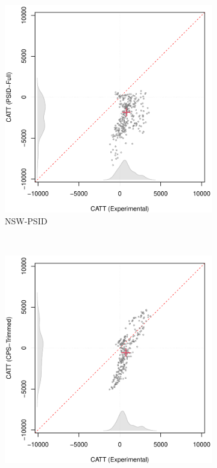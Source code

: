 \documentclass[letterpaper,12pt,leqno]{article}
\begin{document}
\begin{figure}[!ht]
\begin{minipage}[c]{1\textwidth}
\begin{subfigure}{0.4\linewidth}
            \includegraphics[width=\linewidth]{catt_nsw_psid.pdf}
            \caption{NSW-PSID}
        \end{subfigure}\\
        \begin{subfigure}{0.4\linewidth}
            \includegraphics[width=\linewidth]{catt_nsw_cps_trim.pdf}

\end{subfigure}
\end{minipage}
\end{figure}
\end{document}
